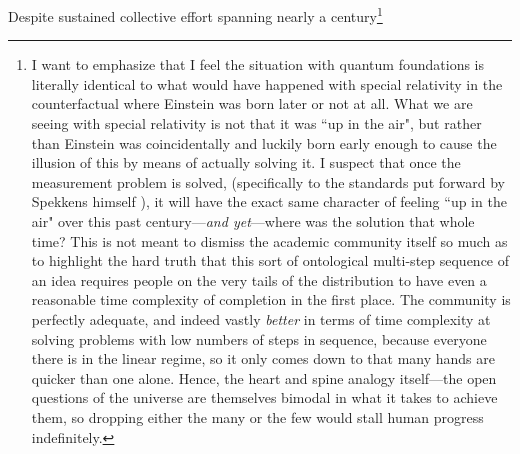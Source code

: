 \documentclass{article}
\begin{document}
Despite sustained collective effort spanning nearly a century\footnote{I want to emphasize that I feel the situation with quantum foundations is literally identical to what would have happened with special relativity in the counterfactual where Einstein was born later or not at all. What we are seeing with special relativity is not that it was ``up in the air", but rather than Einstein was coincidentally and luckily born early enough to cause the illusion of this by means of actually solving it. I suspect that once the measurement problem is solved, (specifically to the standards put forward by Spekkens himself \cite{spekkens2010einstein}), it will have the exact same character of feeling ``up in the air" over this past century---\textit{and yet}---where was the solution that whole time? This is not meant to dismiss the academic community itself so much as to highlight the hard truth that this sort of ontological multi-step sequence of an idea requires people on the very tails of the distribution to have even a reasonable time complexity of completion in the first place. The community is perfectly adequate, and indeed vastly \textit{better} in terms of time complexity at solving problems with low numbers of steps in sequence, because everyone there is in the linear regime, so it only comes down to that many hands are quicker than one alone. Hence, the heart and spine analogy itself---the open questions of the universe are themselves bimodal in what it takes to achieve them, so dropping either the many or the few would stall human progress indefinitely.\par
}
\end{document}
